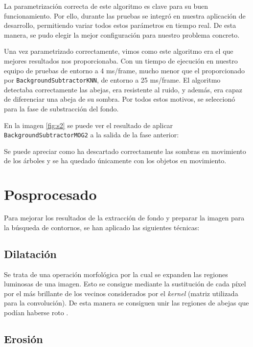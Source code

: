 La parametrización correcta de este algoritmo es clave para su buen
funcionamiento. Por ello, durante las pruebas se integró en nuestra
aplicación de desarrollo, permitiendo variar todos estos parámetros en
tiempo real. De esta manera, se pudo elegir la mejor configuración para
nuestro problema concreto.

Una vez parametrizado correctamente, vimos como este algoritmo era el
que mejores resultados nos proporcionaba. Con un tiempo de ejecución en
nuestro equipo de pruebas de entorno a 4 ms/frame, mucho menor que el
proporcionado por \texttt{BackgroundSubtractorKNN}, de entorno a
25 ms/frame. El algoritmo detectaba correctamente las abejas, era
resistente al ruido, y además, era capaz de diferenciar una abeja de su
sombra. Por todos estos motivos, se seleccionó para la fase de
substracción del fondo.

En la imagen \ref{fig:s2} se puede ver el resultado de aplicar
\\ \texttt{BackgroundSubtractorMOG2} a la salida de la fase anterior:


Se puede apreciar como ha descartado correctamente las sombras en
movimiento de los árboles y se ha quedado únicamente con los objetos en
movimiento.

\section{Posprocesado}\label{posprocesado}

Para mejorar los resultados de la extracción de fondo y preparar la
imagen para la búsqueda de contornos, se han aplicado las siguientes
técnicas:

\subsection{Dilatación}\label{dilatacion}

Se trata de una operación morfológica por la cual se expanden las
regiones luminosas de una imagen. Esto se consigue mediante la
sustitución de cada píxel por el más brillante de los vecinos
considerados por el \emph{kernel} (matriz utilizada para la
convolución). De esta manera se consiguen unir las regiones de abejas
que podían haberse roto \citep{book:mastering_opencv}.

\subsection{Erosión}\label{erosion}

